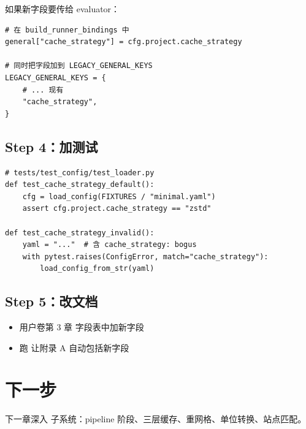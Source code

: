 如果新字段要传给 evaluator：

\begin{verbatim}
# 在 build_runner_bindings 中
general["cache_strategy"] = cfg.project.cache_strategy

# 同时把字段加到 LEGACY_GENERAL_KEYS
LEGACY_GENERAL_KEYS = {
    # ... 现有
    "cache_strategy",
}
\end{verbatim}

\subsection{Step 4：加测试}

\begin{verbatim}
# tests/test_config/test_loader.py
def test_cache_strategy_default():
    cfg = load_config(FIXTURES / "minimal.yaml")
    assert cfg.project.cache_strategy == "zstd"

def test_cache_strategy_invalid():
    yaml = "..."  # 含 cache_strategy: bogus
    with pytest.raises(ConfigError, match="cache_strategy"):
        load_config_from_str(yaml)
\end{verbatim}

\subsection{Step 5：改文档}

\begin{itemize}
  \item 用户卷第 3 章  字段表中加新字段
  \item 跑  让附录 A 自动包括新字段
\end{itemize}

\section{下一步}

下一章深入  子系统：pipeline 阶段、三层缓存、重网格、单位转换、站点匹配。
